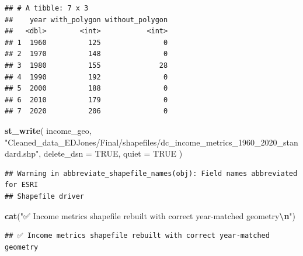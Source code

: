 \documentclass[
]{article}
\newenvironment{Shaded}{\begin{snugshade}}{\end{snugshade}}
\newcommand{\AttributeTok}[1]{\textcolor[rgb]{0.13,0.29,0.53}{#1}}
\newcommand{\ConstantTok}[1]{\textcolor[rgb]{0.56,0.35,0.01}{#1}}
\newcommand{\FunctionTok}[1]{\textcolor[rgb]{0.13,0.29,0.53}{\textbf{#1}}}
\newcommand{\NormalTok}[1]{#1}
\newcommand{\SpecialCharTok}[1]{\textcolor[rgb]{0.81,0.36,0.00}{\textbf{#1}}}
\newcommand{\StringTok}[1]{\textcolor[rgb]{0.31,0.60,0.02}{#1}}
\begin{document}
\begin{verbatim}
## # A tibble: 7 x 3
##    year with_polygon without_polygon
##   <dbl>        <int>           <int>
## 1  1960          125               0
## 2  1970          148               0
## 3  1980          155              28
## 4  1990          192               0
## 5  2000          188               0
## 6  2010          179               0
## 7  2020          206               0
\end{verbatim}

\begin{Shaded}
\begin{Highlighting}[]
\FunctionTok{st\_write}\NormalTok{(}
\NormalTok{  income\_geo,}
  \StringTok{"Cleaned\_data\_EDJones/Final/shapefiles/dc\_income\_metrics\_1960\_2020\_standard.shp"}\NormalTok{,}
  \AttributeTok{delete\_dsn =} \ConstantTok{TRUE}\NormalTok{,}
  \AttributeTok{quiet =} \ConstantTok{TRUE}
\NormalTok{)}
\end{Highlighting}
\end{Shaded}

\begin{verbatim}
## Warning in abbreviate_shapefile_names(obj): Field names abbreviated for ESRI
## Shapefile driver
\end{verbatim}

\begin{Shaded}
\begin{Highlighting}[]
\FunctionTok{cat}\NormalTok{(}\StringTok{"✅ Income metrics shapefile rebuilt with correct year{-}matched geometry}\SpecialCharTok{\textbackslash{}n}\StringTok{"}\NormalTok{)}
\end{Highlighting}
\end{Shaded}

\begin{verbatim}
## ✅ Income metrics shapefile rebuilt with correct year-matched geometry
\end{verbatim}
\end{document}
